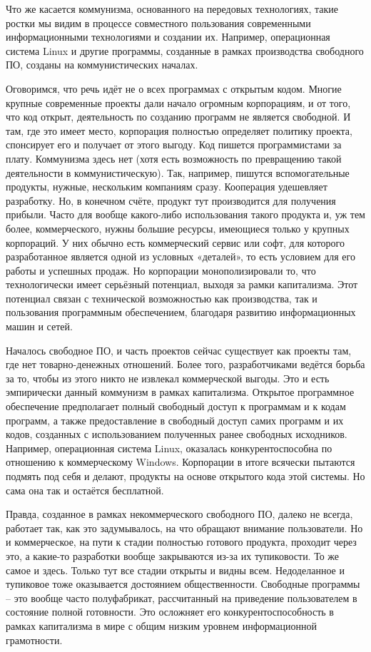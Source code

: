 \documentclass[12pt,a4paper,openany]{book}
\begin{document}
Что же касается коммунизма, основанного на передовых технологиях, такие ростки мы видим в процессе совместного пользования современными информационными технологиями и создании их. Например, операционная система Linux и другие программы, созданные в рамках производства свободного ПО, созданы на коммунистических началах.

Оговоримся, что речь идёт не о всех программах с открытым кодом. Многие крупные современные проекты дали начало огромным корпорациям, и от того, что код открыт, деятельность по созданию программ не является свободной. И там, где это имеет место, корпорация полностью определяет политику проекта, спонсирует его и получает от этого выгоду. Код пишется программистами за плату. Коммунизма здесь нет (хотя есть возможность по превращению такой деятельности в коммунистическую). Так, например, пишутся вспомогательные продукты, нужные, нескольким компаниям сразу. Кооперация удешевляет разработку. Но, в конечном счёте, продукт тут производится для получения прибыли. Часто для вообще какого-либо использования такого продукта и, уж тем более, коммерческого, нужны большие ресурсы, имеющиеся только у крупных корпораций. У них обычно есть коммерческий сервис или софт, для которого разработанное является одной из условных «деталей», то есть условием для его работы и успешных продаж. Но корпорации монополизировали то, что технологически имеет серьёзный потенциал, выходя за рамки капитализма. Этот потенциал связан с технической возможностью как производства, так и пользования программным обеспечением, благодаря развитию информационных машин и сетей.

Началось свободное ПО, и часть проектов сейчас существует как проекты там, где нет товарно-денежных отношений. Более того, разработчиками ведётся борьба за то, чтобы из этого никто не извлекал коммерческой выгоды. Это и есть эмпирически данный коммунизм в рамках капитализма. Открытое программное обеспечение предполагает полный свободный доступ к программам и к кодам программ, а также предоставление в свободный доступ самих программ и их кодов, созданных с использованием полученных ранее свободных исходников. Например, операционная система Linux, оказалась конкурентоспособна по отношению к коммерческому Windows. Корпорации в итоге всячески пытаются подмять под себя и делают, продукты на основе открытого кода этой системы. Но сама она так и остаётся бесплатной.

Правда, созданное в рамках некоммерческого свободного ПО, далеко не всегда, работает так, как это задумывалось, на что обращают внимание пользователи. Но и коммерческое, на пути к стадии полностью готового продукта, проходит через это, а какие-то разработки вообще закрываются из-за их тупиковости. То же самое и здесь. Только тут все стадии открыты и видны всем. Недоделанное и тупиковое тоже оказывается достоянием общественности. Свободные программы – это вообще часто полуфабрикат, рассчитанный на приведение пользователем в состояние полной готовности. Это осложняет его конкурентоспособность в рамках капитализма в мире с общим низким уровнем информационной грамотности.
\end{document}
